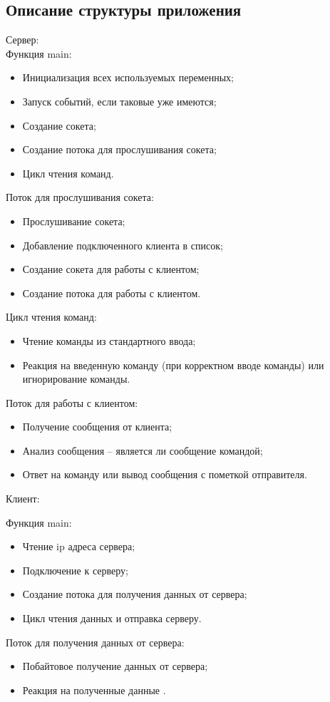 \documentclass[a4paper,14pt]{article}
\begin{document}
\subsection{Описание структуры приложения}
Сервер:\\
Функция main:
	\begin{itemize}		
\item Инициализация всех используемых переменных;
\item Запуск событий, если таковые уже имеются;
\item Создание сокета;
\item Создание потока для прослушивания сокета;
\item Цикл чтения команд.
	\end{itemize}
 Поток для прослушивания сокета:
 \begin{itemize}
\item Прослушивание сокета;
\item Добавление подключенного клиента в список;
\item Создание сокета для работы с клиентом;
\item Создание потока для работы с клиентом.
	\end{itemize}
Цикл чтения команд:
 \begin{itemize}
\item Чтение команды из стандартного ввода;
\item Реакция на введенную команду (при корректном вводе команды) или игнорирование команды.
\end{itemize}
Поток для работы с клиентом:
 \begin{itemize}
\item Получение сообщения от клиента;
\item Анализ сообщения – является ли сообщение командой;
\item Ответ на команду или вывод сообщения с пометкой отправителя.
\end{itemize}
Клиент:

Функция main:
	\begin{itemize}	
\item Чтение ip адреса сервера;
\item Подключение к серверу;
\item Создание потока для получения данных от сервера;
\item Цикл чтения данных и отправка серверу.
\end{itemize}
Поток для получения данных от сервера:
 \begin{itemize}
\item Побайтовое получение данных от сервера;
\item Реакция на полученные данные .
	\end{itemize}
\end{document}
